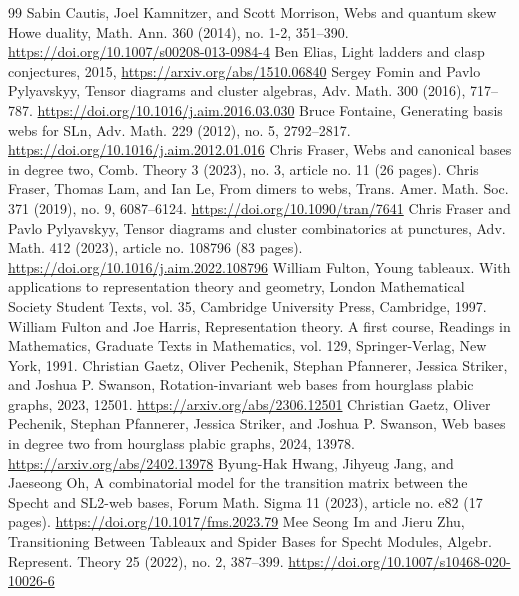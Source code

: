 \documentclass[10pt]{amsart}
\theoremstyle{definition}
\theoremstyle{plain}
\theoremstyle{plain}
\theoremstyle{definition}
\theoremstyle{remark}
\theoremstyle{plain}
\theoremstyle{plain}
\theoremstyle{plain}
\numberwithin{equation}{section}
\begin{document}
\begin{thebibliography}{99}
 Sabin Cautis, Joel Kamnitzer, and Scott Morrison, Webs and quantum skew Howe duality, Math. Ann. 360 (2014), no. 1-2, 351–390. \url{https://doi.org/10.1007/s00208-013-0984-4}
 Ben Elias, Light ladders and clasp conjectures, 2015, \url{https://arxiv.org/abs/1510.06840}
 Sergey Fomin and Pavlo Pylyavskyy, Tensor diagrams and cluster algebras, Adv. Math. 300 (2016), 717–787. \url{https://doi.org/10.1016/j.aim.2016.03.030}
 Bruce Fontaine, Generating basis webs for SLn, Adv. Math. 229 (2012), no. 5, 2792–2817. \url{https://doi.org/10.1016/j.aim.2012.01.016}
 Chris Fraser, Webs and canonical bases in degree two, Comb. Theory 3 (2023), no. 3, article no. 11 (26 pages). 
 Chris Fraser, Thomas Lam, and Ian Le, From dimers to webs, Trans. Amer. Math. Soc. 371 (2019), no. 9, 6087–6124. \url{https://doi.org/10.1090/tran/7641}
 Chris Fraser and Pavlo Pylyavskyy, Tensor diagrams and cluster combinatorics at punctures, Adv. Math. 412 (2023), article no. 108796 (83 pages). \url{https://doi.org/10.1016/j.aim.2022.108796}
 William Fulton, Young tableaux. With applications to representation theory and geometry, London Mathematical Society Student Texts, vol. 35, Cambridge University Press, Cambridge, 1997. 
 William Fulton and Joe Harris, Representation theory. A first course, Readings in Mathematics, Graduate Texts in Mathematics, vol. 129, Springer-Verlag, New York, 1991. 
 Christian Gaetz, Oliver Pechenik, Stephan Pfannerer, Jessica Striker, and Joshua P. Swanson, Rotation-invariant web bases from hourglass plabic graphs, 2023,  12501. \url{https://arxiv.org/abs/2306.12501}
 Christian Gaetz, Oliver Pechenik, Stephan Pfannerer, Jessica Striker, and Joshua P. Swanson, Web bases in degree two from hourglass plabic graphs, 2024,  13978. \url{https://arxiv.org/abs/2402.13978}
 Byung-Hak Hwang, Jihyeug Jang, and Jaeseong Oh, A combinatorial model for the transition matrix between the Specht and SL2-web bases, Forum Math. Sigma 11 (2023), article no. e82 (17 pages). \url{https://doi.org/10.1017/fms.2023.79}
 Mee Seong Im and Jieru Zhu, Transitioning Between Tableaux and Spider Bases for Specht Modules, Algebr. Represent. Theory 25 (2022), no. 2, 387–399. \url{https://doi.org/10.1007/s10468-020-10026-6}

\end{thebibliography}
\end{document}
